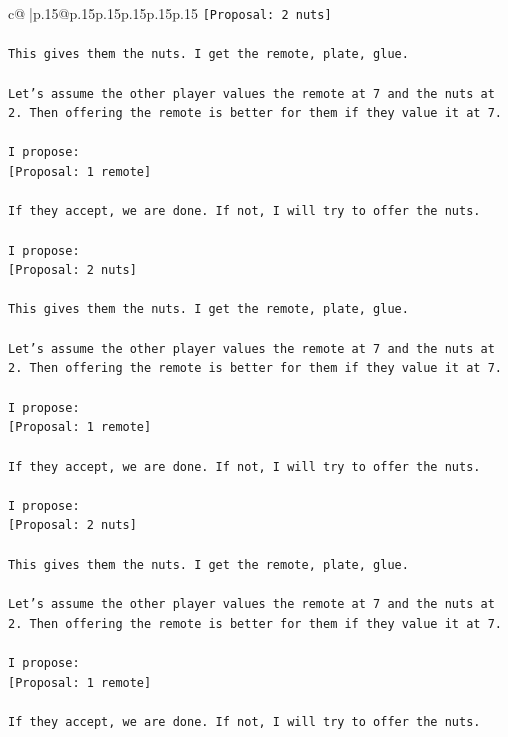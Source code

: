 \documentclass{article}
\begin{document}
{\begin{supertabular}{c@{$\;$}|p{.15\linewidth}@{}p{.15\linewidth}p{.15\linewidth}p{.15\linewidth}p{.15\linewidth}p{.15\linewidth}}
{{{\texttt{{[}Proposal: 2 nuts{]}} \\
\\ 
\texttt{This gives them the nuts. I get the remote, plate, glue.} \\
\\ 
\texttt{Let's assume the other player values the remote at 7 and the nuts at 2. Then offering the remote is better for them if they value it at 7.} \\
\\ 
\texttt{I propose:} \\
\texttt{{[}Proposal: 1 remote{]}} \\
\\ 
\texttt{If they accept, we are done. If not, I will try to offer the nuts.} \\
\\ 
\texttt{I propose:} \\
\texttt{{[}Proposal: 2 nuts{]}} \\
\\ 
\texttt{This gives them the nuts. I get the remote, plate, glue.} \\
\\ 
\texttt{Let's assume the other player values the remote at 7 and the nuts at 2. Then offering the remote is better for them if they value it at 7.} \\
\\ 
\texttt{I propose:} \\
\texttt{{[}Proposal: 1 remote{]}} \\
\\ 
\texttt{If they accept, we are done. If not, I will try to offer the nuts.} \\
\\ 
\texttt{I propose:} \\
\texttt{{[}Proposal: 2 nuts{]}} \\
\\ 
\texttt{This gives them the nuts. I get the remote, plate, glue.} \\
\\ 
\texttt{Let's assume the other player values the remote at 7 and the nuts at 2. Then offering the remote is better for them if they value it at 7.} \\
\\ 
\texttt{I propose:} \\
\texttt{{[}Proposal: 1 remote{]}} \\
\\ 
\texttt{If they accept, we are done. If not, I will try to offer the nuts.} \\
}}}
\end{supertabular}}
\end{document}
